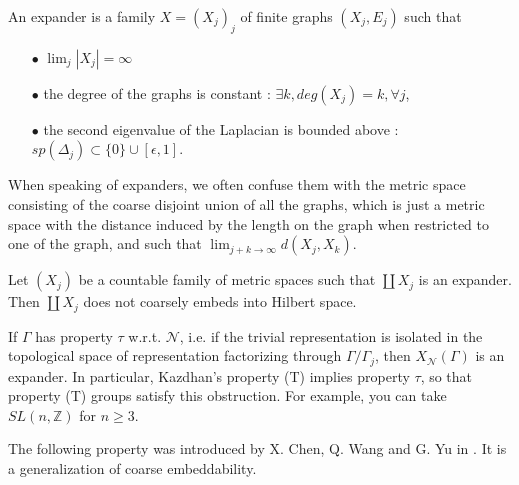 \begin{definition}
An expander is a family $X=(X_j)_j$ of finite graphs $(X_j,E_j)$ such that 
\begin{itemize}
\item[$\bullet$] $\lim_{j}|X_j|=\infty$
\item[$\bullet$] the degree of the graphs is constant : $\exists k, deg(X_j)=k,\forall j$,
\item[$\bullet$] the second eigenvalue of the Laplacian is bounded above : $sp(\Delta_j)\subset \{0\}\cup [\epsilon,1]$.
\end{itemize}
\end{definition}
When speaking of expanders, we often confuse them with the metric space consisting of the coarse disjoint union of all the graphs, which is just a metric space with the distance induced by the length on the graph when restricted to one of the graph, and such that $\lim_{j+k\rightarrow \infty}d(X_j,X_k)$.

\begin{prop}\cite{NowakYu}
Let $(X_j)$ be a countable family of metric spaces such that $\coprod X_j$ is an expander. Then $\coprod X_j$ does not coarsely embeds into Hilbert space.
\end{prop}

\begin{thm}\cite{NowakYu}
If $\Gamma$ has property $\tau$ w.r.t. $\mathcal N$, i.e. if the trivial representation is isolated in the topological space of representation factorizing through $\Gamma/\Gamma_j$, then $X_{\mathcal N}(\Gamma)$ is an expander. In particular, Kazdhan's property (T) implies property $\tau$, so that property (T) groups satisfy this obstruction. For example, you can take $SL(n,\mathbb Z)$ for $n\geq 3$. 
\end{thm} 

The following property was introduced by X. Chen, Q. Wang and G. Yu in \cite{ChenWangYu}. It is a generalization of coarse embeddability.

